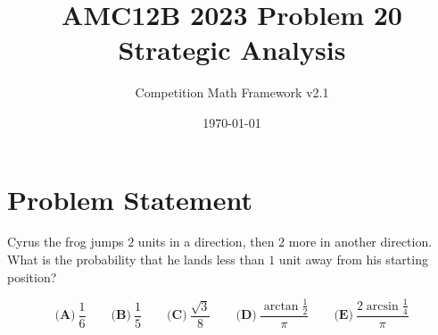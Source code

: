 \documentclass[12pt]{article}
\begin{document}
\title{AMC12B 2023 Problem 20\\Strategic Analysis}
\author{Competition Math Framework v2.1}
\date{\today}
\maketitle

\section*{Problem Statement}

Cyrus the frog jumps $2$ units in a direction, then $2$ more in another direction. What is the probability that he lands less than $1$ unit away from his starting position?

$$\textbf{(A)}~\frac{1}{6}\qquad\textbf{(B)}~\frac{1}{5}\qquad\textbf{(C)}~\frac{\sqrt{3}}{8}\qquad\textbf{(D)}~\frac{\arctan \frac{1}{2}}{\pi}\qquad\textbf{(E)}~\frac{2\arcsin \frac{1}{4}}{\pi}$$
\end{document}

